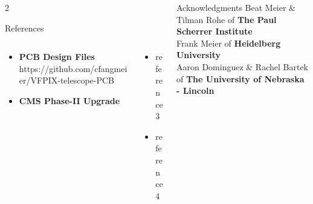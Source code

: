 \documentclass[final]{beamer}
\newlength{\onecolwide}
\begin{document}
\begin{frame}[t]
\begin{columns}[t]
  \begin{column}{2\onecolwide}
    \begin{block}{References} 
    \begin{columns}[t]
      \begin{column}{\onecolwide}
        \begin{itemize}
          \item \textbf{PCB Design Files} https://github.com/cfangmeier/VFPIX-telescope-PCB
          \item \textbf{CMS Phase-II Upgrade}
        \end{itemize}
      \end{column}
      \begin{column}{\onecolwide}
        \begin{itemize}
          \item reference 3
          \item reference 4
        \end{itemize}
      \end{column}
    \end{columns}
    \end{block}
  \end{column}
  \begin{column}{\onecolwide}
    \small
    \begin{block}{Acknowledgments} 
        Beat Meier \& Tilman Rohe of \textbf{The Paul Scherrer Institute}\\
        Frank Meier of \textbf{Heidelberg University}\\
        Aaron Dominguez \& Rachel Bartek of \textbf{The University of Nebraska \-- Lincoln}
    \end{block}
  \end{column}
\end{columns}

\end{frame} %
\end{document}
